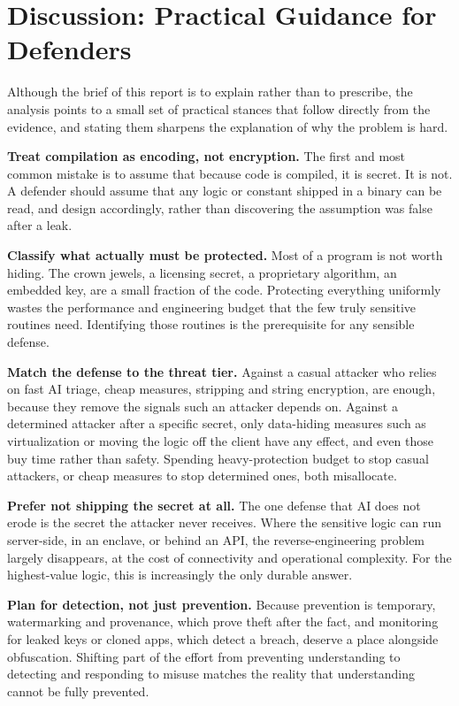 \documentclass[conference]{IEEEtran}
\begin{document}
\section{Discussion: Practical Guidance for Defenders}
Although the brief of this report is to explain rather than to prescribe, the
analysis points to a small set of practical stances that follow directly from the
evidence, and stating them sharpens the explanation of why the problem is hard.

\textbf{Treat compilation as encoding, not encryption.} The first and most common
mistake is to assume that because code is compiled, it is secret. It is not. A
defender should assume that any logic or constant shipped in a binary can be read,
and design accordingly, rather than discovering the assumption was false after a
leak.

\textbf{Classify what actually must be protected.} Most of a program is not worth
hiding. The crown jewels, a licensing secret, a proprietary algorithm, an embedded
key, are a small fraction of the code. Protecting everything uniformly wastes the
performance and engineering budget that the few truly sensitive routines need.
Identifying those routines is the prerequisite for any sensible defense.

\textbf{Match the defense to the threat tier.} Against a casual attacker who relies
on fast AI triage, cheap measures, stripping and string encryption, are enough,
because they remove the signals such an attacker depends on. Against a determined
attacker after a specific secret, only data-hiding measures such as virtualization
or moving the logic off the client have any effect, and even those buy time rather
than safety. Spending heavy-protection budget to stop casual attackers, or cheap
measures to stop determined ones, both misallocate.

\textbf{Prefer not shipping the secret at all.} The one defense that AI does not
erode is the secret the attacker never receives. Where the sensitive logic can run
server-side, in an enclave, or behind an API, the reverse-engineering problem
largely disappears, at the cost of connectivity and operational complexity. For the
highest-value logic, this is increasingly the only durable answer.

\textbf{Plan for detection, not just prevention.} Because prevention is temporary,
watermarking and provenance, which prove theft after the fact, and monitoring for
leaked keys or cloned apps, which detect a breach, deserve a place alongside
obfuscation. Shifting part of the effort from preventing understanding to detecting
and responding to misuse matches the reality that understanding cannot be fully
prevented.
\end{document}
